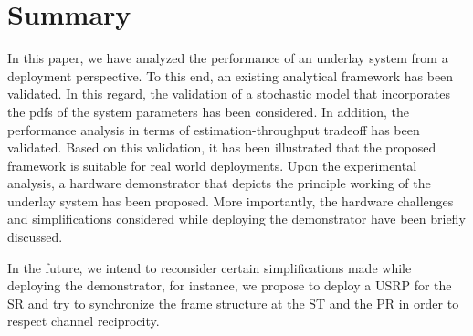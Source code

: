 \section{Summary}
\label{con}

In this paper, we have analyzed the performance of an underlay system from a deployment perspective. To this end, an existing analytical framework \cite{Kaushik15} has been validated. In this regard, the validation of a stochastic model that incorporates the pdfs of the system parameters has been considered. In addition, the performance analysis in terms of estimation-throughput tradeoff has been validated. Based on this validation, it has been illustrated that the proposed framework is suitable for real world deployments. Upon the experimental analysis, a hardware demonstrator that depicts the principle working of the underlay system has been proposed. More importantly, the hardware challenges and simplifications considered while deploying the demonstrator have been briefly discussed.  

In the future, we intend to reconsider certain simplifications made while deploying the demonstrator, for instance, we propose to deploy a USRP for the SR and try to synchronize the frame structure at the ST and the PR in order to respect channel reciprocity.












